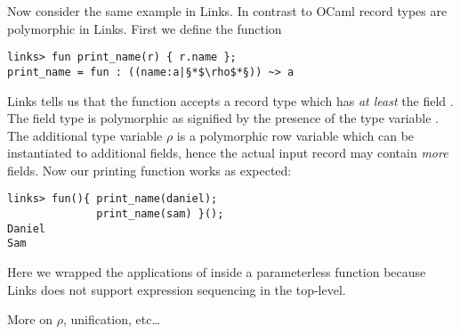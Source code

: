 \begin{example}
Now consider the same example in Links. In contrast to OCaml record types are polymorphic in Links.
First we define the  function
\begin{lstlisting}[style=links]
links> fun print_name(r) { r.name };
print_name = fun : ((name:a|§*$\rho$*§)) ~> a
\end{lstlisting}
Links tells us that the function accepts a record type which has \emph{at least} the field . The field type is polymorphic as signified by the presence of the type variable . The additional type variable $\rho$ is a polymorphic row variable which can be instantiated to additional fields, hence the actual input record may contain \emph{more} fields. Now our printing function works as expected:
\begin{lstlisting}[style=links]
links> fun(){ print_name(daniel);
              print_name(sam) }();
Daniel
Sam
\end{lstlisting}
Here we wrapped the applications of  inside a parameterless function because Links does not support expression sequencing in the top-level.
\end{example}
More on $\rho$, unification, etc\dots


